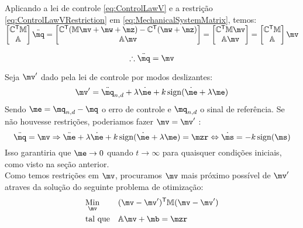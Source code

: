 Aplicando a lei de controle \eqref{eq:ControlLawV} e a restri\c{c}\~ao \eqref{eq:ControlLawVRestriction} em \eqref{eq:MechanicalSystemMatrix}, temos: \\

$ \begin{bmatrix}
\mC^\msT \mM \\
\mA
\end{bmatrix}
\ddot{\mq}
=
\begin{bmatrix}
\mC^\msT ( \mM \mv + \mw + \mz ) - \mC^\msT(\mw + \mz) \\
\mA \mv
\end{bmatrix}
=
\begin{bmatrix}
\mC^\msT  \mM \mv \\
\mA \mv
\end{bmatrix}
=
\begin{bmatrix}
\mC^\msT \mM \\
\mA
\end{bmatrix}
\mv $

\begin{equation} \label{eq:ClosedLoopV}
\therefore \ddot{\mq} = \mv
\end{equation}

Seja $\mv'$ dado pela lei de controle por modos deslizantes:
\begin{equation} \label{eq:SMControlowLasV1'}
\mv' = \ddot{\mq}_{n, d} + \lambda \dot{\me} + k \sign (\dot{\me} + \lambda \me)
\end{equation}
Sendo $ \me = \mq_{n,d} - \mq $ o erro de controle e $\mq_{n,d}$ o sinal de refer\^encia. Se n\~ao houvesse restri\c{c}\~oes, poderiamos fazer $ \mv = \mv' $ :
$$ \ddot{\mq} = \mv \Rightarrow  \ddot{\me} + \lambda \dot{\me} + k \sign (\dot{\me} + \lambda \me) = \mzr \Leftrightarrow \dot{\ms} = - k \sign(\ms)$$
Isso garantiria que $\me \rightarrow 0$ quando $t \rightarrow \infty$ para quaisquer condi\c{c}\~oes iniciais, como visto na se\c{c}\~ao anterior. \\

Como temos restri\c{c}\~oes em $\mv$, procuramos $\mv$ mais pr\'oximo poss\'ivel de $\mv'$ atraves da solu\c{c}\~ao do seguinte problema de otimiza\c{c}\~ao:
\begin{equation} \label{eq:Optimization}
\begin{aligned}
& \underset{\mv}{\text{Min}}
& & (\mv - \mv')^\msT \mM (\mv - \mv') \\
& \text{tal que}
& & \mA \mv + \mb = \mzr
\end{aligned}
\end{equation}

